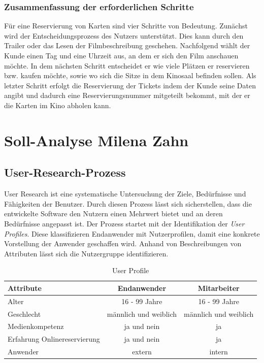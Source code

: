 	\subsubsection{Zusammenfassung der erforderlichen Schritte} 
	Für eine Reservierung von Karten sind vier Schritte von Bedeutung. Zunächst wird der Entscheidungsprozess des Nutzers unterstützt. Dies kann durch den Trailer oder das Lesen der Filmbeschreibung geschehen. Nachfolgend wählt der Kunde einen Tag und eine Uhrzeit aus, an dem er sich den Film anschauen möchte. In dem nächsten Schritt entscheidet er wie viele Plätzen er reservieren bzw. kaufen möchte, sowie wo sich die Sitze in dem Kinosaal befinden sollen. Als letzter Schritt erfolgt die Reservierung der Tickets indem der Kunde seine Daten angibt und dadurch eine Reservierungsnummer mitgeteilt bekommt, mit der er die Karten im Kino abholen kann.
	
	\section[Soll-Analyse]{Soll-Analyse {\hfill \normalsize Milena Zahn}}
		
	 	\subsection{User-Research-Prozess} 
	 	User Research ist eine systematische Untersuchung der Ziele, Bedürfnisse und Fähigkeiten der Benutzer\autocite[Vgl.][S. 6]{Schumacher.2010}.
	 	Durch diesen Prozess lässt sich sicherstellen, dass die entwickelte Software den Nutzern einen Mehrwert bietet und an deren Bedürfnisse angepasst ist.
		Der Prozess startet mit der Identifikation der \textit{User Profiles}. Diese klassifizieren Endanwender mit Nutzerprofilen, damit eine konkrete Vorstellung der Anwender geschaffen wird. Anhand von Beschreibungen von Attributen lässt sich die Nutzergruppe identifizieren.
		
		\begin{table}[H]
			\centering
			\begin{tabular}{p{} || c | c }
				\textbf{Attribute} & \textbf{Endanwender} & \textbf{Mitarbeiter} \\\toprule
				Alter &  16 - 99 Jahre &  16 - 99 Jahre \\
				Geschlecht &  männlich und weiblich &  männlich und weiblich  \\
				Medienkompetenz &  ja und nein &  ja  \\
				Erfahrung Onlinereservierung &  ja und nein &  ja  \\
				Anwender &  extern &  intern  \\
			\end{tabular}
			\caption[User Profile]{\label{tab:tabelleUserProfile}User Profile }
		\end{table}
		
